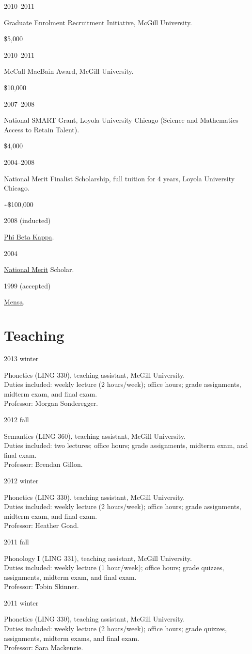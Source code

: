 \documentclass[11pt,letterpaper]{article}
\newcommand{\cvitem}[2]{%
  \begin{minipage}[t]{0.24\textwidth}
    #1 %
  \end{minipage}
  \hfill
  \begin{minipage}[t]{0.74\textwidth}
    #2 %
  \end{minipage}
}
\newcommand{\tadetails}[2]{%
  {\footnotesize Duties included: #1. \\ Professor: #2.}
}
\newcommand{\award}[2]{%
  \begin{minipage}[t]{0.78\textwidth}
    #1        %
  \end{minipage}
  \hfill
  \begin{minipage}[t]{0.20\textwidth}
    \hfill #2 %
  \end{minipage}
}
\begin{document}
\cvitem{2010--2011}{\award{Graduate Enrolment Recruitment Initiative, McGill
University.}{\$5,000}}

\cvitem{2010--2011}{\award{McCall MacBain Award, McGill University.}{\$10,000}}

\cvitem{2007--2008}{\award{National SMART Grant, Loyola University Chicago
(Science and Mathematics Access to Retain Talent).}{\$4,000}}

\cvitem{2004--2008}{\award{National Merit Finalist Scholarship, full tuition for
4 years, Loyola University Chicago.}{\textasciitilde\$100,000}}

\cvitem{2008 {\footnotesize (inducted)}}{\href{http://www.pbk.org/}{Phi Beta
Kappa}.}

\cvitem{2004}{\href{http://www.nationalmerit.org/}{National Merit} Scholar.}

\cvitem{1999 {\footnotesize (accepted)}}{\href{http://www.mensa.org/}{Mensa}.}



\section*{Teaching}

\cvitem{2013 winter}{Phonetics (LING 330), teaching assistant, McGill
  University. \\ \tadetails{weekly lecture (2 hours/week); office hours; grade
  assignments, midterm exam, and final exam}{Morgan Sonderegger}}

\cvitem{2012 fall}{Semantics (LING 360), teaching assistant, McGill University.
  \\ \tadetails{two lectures; office hours; grade assignments, midterm exam,
  and final exam}{Brendan Gillon}}

\cvitem{2012 winter}{Phonetics (LING 330), teaching assistant, McGill
  University. \\ \tadetails{weekly lecture (2 hours/week); office hours; grade
  assignments, midterm exam, and final exam}{Heather Goad}}

\cvitem{2011 fall}{Phonology I (LING 331), teaching assistant, McGill
  University. \\ \tadetails{weekly lecture (1 hour/week); office hours; grade
  quizzes, assignments, midterm exam, and final exam}{Tobin Skinner}}

\cvitem{2011 winter}{Phonetics (LING 330), teaching assistant, McGill
  University. \\ \tadetails{weekly lecture (2 hours/week); office hours; grade
  quizzes, assignments, midterm exams, and final exam}{Sara Mackenzie}}
\end{document}

